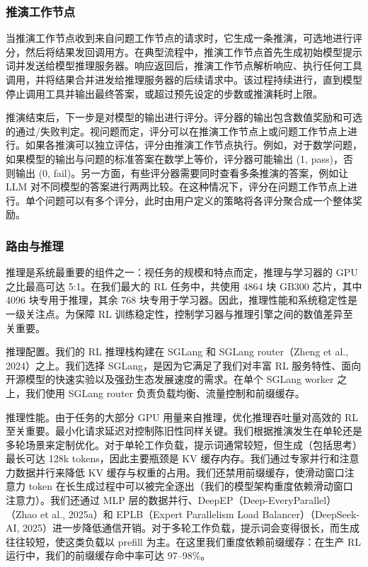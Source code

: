 \documentclass[
  10
]{article}
\begin{document}
\subsubsection{推演工作节点}\label{rollout-worker}

当推演工作节点收到来自问题工作节点的请求时，它生成一条推演，可选地进行评分，然后将结果发回调用方。在典型流程中，推演工作节点首先生成初始模型提示词并发送给模型推理服务器。响应返回后，推演工作节点解析响应、执行任何工具调用，并将结果合并进发给推理服务器的后续请求中。该过程持续进行，直到模型停止调用工具并输出最终答案，或超过预先设定的步数或推演耗时上限。

推演结束后，下一步是对模型的输出进行评分。评分器的输出包含数值奖励和可选的通过/失败判定。视问题而定，评分可以在推演工作节点上或问题工作节点上进行。如果各推演可以独立评估，评分由推演工作节点执行。例如，对于数学问题，如果模型的输出与问题的标准答案在数学上等价，评分器可能输出 (1, pass)，否则输出 (0, fail)。另一方面，有些评分器需要同时查看多条推演的答案，例如让 LLM 对不同模型的答案进行两两比较。在这种情况下，评分在问题工作节点上进行。单个问题可以有多个评分，此时由用户定义的策略将各评分聚合成一个整体奖励。

\subsubsection{路由与推理}\label{router-and-inference}

推理是系统最重要的组件之一：视任务的规模和特点而定，推理与学习器的 GPU 之比最高可达 5:1。在我们最大的 RL 任务中，共使用 4864 块 GB300 芯片，其中 4096 块专用于推理，其余 768 块专用于学习器。因此，推理性能和系统稳定性是一级关注点。为保障 RL 训练稳定性，控制学习器与推理引擎之间的数值差异至关重要。

推理配置。我们的 RL 推理栈构建在 SGLang 和 SGLang router（Zheng et al., 2024）之上。我们选择 SGLang，是因为它满足了我们对丰富 RL 服务特性、面向开源模型的快速实验以及强劲生态发展速度的需求。在单个 SGLang worker 之上，我们使用 SGLang router 负责负载均衡、流量控制和前缀缓存。

推理性能。由于任务的大部分 GPU 用量来自推理，优化推理吞吐量对高效的 RL 至关重要。最小化请求延迟对控制陈旧性同样关键。我们根据推演发生在单轮还是多轮场景来定制优化。对于单轮工作负载，提示词通常较短，但生成（包括思考）最长可达 128k tokens，因此主要瓶颈是 KV 缓存内存。我们通过专家并行和注意力数据并行来降低 KV 缓存与权重的占用。我们还禁用前缀缓存，使滑动窗口注意力 token 在长生成过程中可以被完全逐出（我们的模型架构重度依赖滑动窗口注意力）。我们还通过 MLP 层的数据并行、DeepEP（Deep-EveryParallel）（Zhao et al., 2025a）和 EPLB（Expert Parallelism Load Balancer）（DeepSeek-AI, 2025）进一步降低通信开销。对于多轮工作负载，提示词会变得很长，而生成往往较短，使这类负载以 prefill 为主。在这里我们重度依赖前缀缓存：在生产 RL 运行中，我们的前缀缓存命中率可达 97--98\%。
\end{document}
